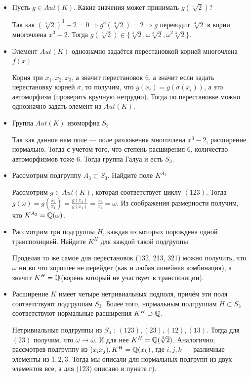 \begin{itemize}
    \item[а)] Пусть $g \in Aut(K)$. Какие значения может принимать $g(\sqrt[3]{2})$?
    \par \Proof Так как $(\sqrt[3]{2})^3-2=0 \Rightarrow g^3(\sqrt[3]{2})=2 \Rightarrow g$ переводит $\sqrt[3]{2}$ в корни многочлена $x^3-2$. Тогда $g(\sqrt[3]{2}) \in \{\sqrt[3]{2}, \omega \sqrt[3]{2}, \omega^2 \sqrt[3]{2}\}$. \EndProof
    
    \item[б)] Элемент $Aut(K)$ однозначно задаётся перестановкой корней многочлена $f(x)$
    \par \Proof Корня три $x_1, x_2, x_3$, а значит перестановок 6, а значит если задать перестановку корней $\sigma$, то получим, что $g(x_i)=g(\sigma(x_i))$, а это автоморфизм (проверить вручную нетрудно). Тогда по перестановке можно однозначно задать элемент из $Aut(K)$. \EndProof
    
    \item[в)] Группа $Aut(K)$ изоморфна $S_3$
    \par \Proof Так как данное нам поле — поле разложения многочлена $x^3-2$, расширение нормально. Тогда с учетом того, что степень расширения 6, количество автоморфизмов тоже 6. Тогда группа Галуа и есть $S_3$. \EndProof

    \item[г)] Рассмотрим подгруппу $A_3 \subset S_3$. Найдите поле $K^{A_3}$
    \par \Proof Рассмотрим $g \in Aut(K)$, которая соответствует циклу $(123)$. Тогда $g(\omega)=g(\frac{x_2}{x_1})=\frac{g(x_2)}{g(x_1)}=\frac{x_3}{x_2}=\omega$. Из соображения размерности получим, что $K^{A_3}=\mathbb{Q}(\omega)$. \EndProof
    
    \item[д)] Рассмотрим три подгруппы $H$, каждая из которых порождена одной транспозицией. Найдите $K^H$ для каждой такой подгруппы
    \par \Proof Проделав то же самое для перестановок (132, 213, 321) можно получить, что $\omega$ ни во что хорошее не перейдет (как и любая линейная комбинация), а значит $K^H=\mathbb{Q}$(корень который не участвует в транспозиции). \EndProof
    
    \item[е)] Расширение $K$ имеет четыре нетривиальных подполя, причём эти поля соответствуют подгруппам $S_3$. Более того, нормальным подгруппам $H \subset S_3$ соответствуют нормальные расширения $K^H \supset \mathbb{Q}$.
    \par \Proof Нетривиальные подгруппы из $S_3$ : $(123),(23),(12),(13)$. Тогда для $(23)$ получим, что $\omega \rightarrow \overline{\omega}$. И для нее $K^H=\mathbb{Q}(\sqrt[3]{2})$. Аналогично, рассмотрев подгруппу из $(x_ix_j), K^H=\mathbb{Q}(x_k)$, где $i,j,k$ — различные элементы из $1, 2, 3$. Тогда мы описали для нормальных подгрупп из двух элементов все, а для (123) описано в пункте г). \EndProof 
\end{itemize}